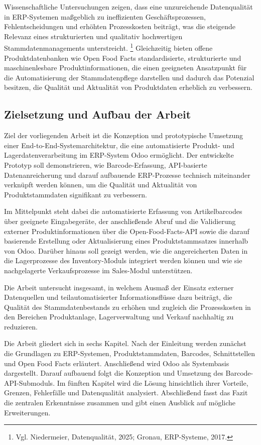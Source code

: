 \documentclass[12pt,a4paper]{article}
\newcommand{\fommanualfootcite}[1]{%
  \footnote{#1}%
}
\begin{document}
Wissenschaftliche Untersuchungen zeigen, dass eine unzureichende Datenqualität in ERP-Systemen maßgeblich zu ineffizienten Geschäftsprozessen, Fehlentscheidungen und erhöhten Prozesskosten beiträgt, was die steigende Relevanz eines strukturierten und qualitativ hochwertigen Stammdatenmanagements unterstreicht.\fommanualfootcite{Vgl. Niedermeier, Datenqualität, 2025; Gronau, ERP-Systeme, 2017.} Gleichzeitig bieten offene Produktdatenbanken wie Open Food Facts standardisierte, strukturierte und maschinenlesbare Produktinformationen, die einen geeigneten Ansatzpunkt für die Automatisierung der Stammdatenpflege darstellen und dadurch das Potenzial besitzen, die Qualität und Aktualität von Produktdaten erheblich zu verbessern.

\subsection{Zielsetzung und Aufbau der Arbeit}

Ziel der vorliegenden Arbeit ist die Konzeption und prototypische Umsetzung einer End-to-End-Systemarchitektur, die eine automatisierte Produkt- und Lagerdatenverarbeitung im ERP-System Odoo ermöglicht. Der entwickelte Prototyp soll demonstrieren, wie Barcode-Erfassung, API-basierte Datenanreicherung und darauf aufbauende ERP-Prozesse technisch miteinander verknüpft werden können, um die Qualität und Aktualität von Produktstammdaten signifikant zu verbessern.

Im Mittelpunkt steht dabei die automatisierte Erfassung von Artikelbarcodes über geeignete Eingabegeräte, der anschließende Abruf und die Validierung externer Produktinformationen über die Open-Food-Facts-API sowie die darauf basierende Erstellung oder Aktualisierung eines Produktstammsatzes innerhalb von Odoo. Darüber hinaus soll gezeigt werden, wie die angereicherten Daten in die Lagerprozesse des Inventory-Moduls integriert werden können und wie sie nachgelagerte Verkaufsprozesse im Sales-Modul unterstützen.

Die Arbeit untersucht insgesamt, in welchem Ausmaß der Einsatz externer Datenquellen und teilautomatisierter Informationsflüsse dazu beiträgt, die Qualität des Stammdatenbestands zu erhöhen und zugleich die Prozesskosten in den Bereichen Produktanlage, Lagerverwaltung und Verkauf nachhaltig zu reduzieren.

Die Arbeit gliedert sich in sechs Kapitel. Nach der Einleitung werden zunächst die Grundlagen zu ERP-Systemen, Produktstammdaten, Barcodes, Schnittstellen und Open Food Facts erläutert. Anschließend wird Odoo als Systembasis dargestellt. Darauf aufbauend folgt die Konzeption und Umsetzung des Barcode-API-Submoduls. Im fünften Kapitel wird die Lösung hinsichtlich ihrer Vorteile, Grenzen, Fehlerfälle und Datenqualität analysiert. Abschließend fasst das Fazit die zentralen Erkenntnisse zusammen und gibt einen Ausblick auf mögliche Erweiterungen.
\end{document}
